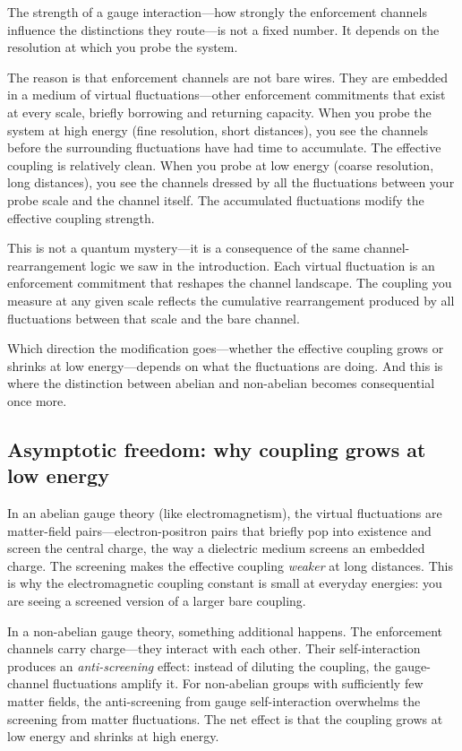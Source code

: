\documentclass[11pt]{article}
\begin{document}
The strength of a gauge interaction---how strongly the enforcement channels influence the distinctions they route---is not a fixed number.  It depends on the resolution at which you probe the system.

The reason is that enforcement channels are not bare wires.  They are embedded in a medium of virtual fluctuations---other enforcement commitments that exist at every scale, briefly borrowing and returning capacity.  When you probe the system at high energy (fine resolution, short distances), you see the channels before the surrounding fluctuations have had time to accumulate.  The effective coupling is relatively clean.  When you probe at low energy (coarse resolution, long distances), you see the channels dressed by all the fluctuations between your probe scale and the channel itself.  The accumulated fluctuations modify the effective coupling strength.

This is not a quantum mystery---it is a consequence of the same channel-rearrangement logic we saw in the introduction.  Each virtual fluctuation is an enforcement commitment that reshapes the channel landscape.  The coupling you measure at any given scale reflects the cumulative rearrangement produced by all fluctuations between that scale and the bare channel.

Which direction the modification goes---whether the effective coupling grows or shrinks at low energy---depends on what the fluctuations are doing.  And this is where the distinction between abelian and non-abelian becomes consequential once more.

\subsection{Asymptotic freedom: why coupling grows at low energy}

In an abelian gauge theory (like electromagnetism), the virtual fluctuations are matter-field pairs---electron-positron pairs that briefly pop into existence and screen the central charge, the way a dielectric medium screens an embedded charge.  The screening makes the effective coupling \emph{weaker} at long distances.  This is why the electromagnetic coupling constant is small at everyday energies: you are seeing a screened version of a larger bare coupling.

In a non-abelian gauge theory, something additional happens.  The enforcement channels carry charge---they interact with each other.  Their self-interaction produces an \emph{anti-screening} effect: instead of diluting the coupling, the gauge-channel fluctuations amplify it.  For non-abelian groups with sufficiently few matter fields, the anti-screening from gauge self-interaction overwhelms the screening from matter fluctuations.  The net effect is that the coupling grows at low energy and shrinks at high energy.
\end{document}
